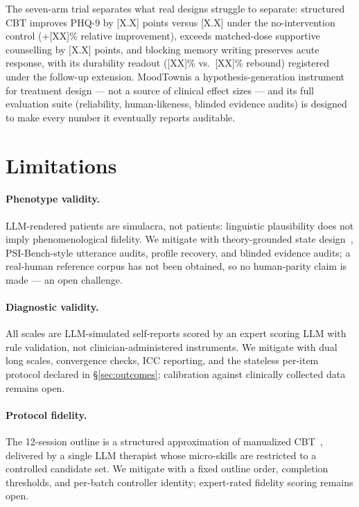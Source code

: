 \documentclass[10pt]{article}
\newcommand{\sys}{MoodTown}
\begin{document}
The seven-arm trial separates what real designs struggle to separate: structured CBT improves PHQ-9 by [X.X] points versus [X.X] under the no-intervention control (+[XX]\% relative improvement), exceeds matched-dose supportive counselling by [X.X] points, and blocking memory writing preserves acute response, with its durability readout ([XX]\% vs.\ [XX]\% rebound) registered under the follow-up extension.
\sys is a hypothesis-generation instrument for treatment design --- not a source of clinical effect sizes --- and its full evaluation suite (reliability, human-likeness, blinded evidence audits) is designed to make every number it eventually reports auditable.

\section*{Limitations}\label{sec:limitations}

\paragraph{Phenotype validity.}
LLM-rendered patients are simulacra, not patients: linguistic plausibility does not imply phenomenological fidelity.
We mitigate with theory-grounded state design~\citep{patientact2026}, PSI-Bench-style utterance audits, profile recovery, and blinded evidence audits; a real-human reference corpus has not been obtained, so no human-parity claim is made --- an open challenge.

\paragraph{Diagnostic validity.}
All scales are LLM-simulated self-reports scored by an expert scoring LLM with rule validation, not clinician-administered instruments.
We mitigate with dual long scales, convergence checks, ICC reporting, and the stateless per-item protocol declared in \S\ref{sec:outcomes}; calibration against clinically collected data remains open.

\paragraph{Protocol fidelity.}
The 12-session outline is a structured approximation of manualized CBT~\citep{beck1979}, delivered by a single LLM therapist whose micro-skills are restricted to a controlled candidate set.
We mitigate with a fixed outline order, completion thresholds, and per-batch controller identity; expert-rated fidelity scoring remains open.
\end{document}
